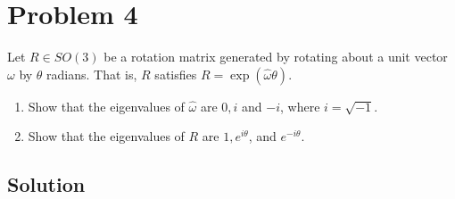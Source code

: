 \section*{Problem 4}

Let \(R \in S O(3)\) be a rotation matrix generated by rotating about a unit vector \(\omega \) by \(\theta \) radians.
That is, \(R\) satisfies \(R=\exp (\hat{\omega} \theta)\).
\begin{enumerate}[label= (\alph*)]
    \item Show that the eigenvalues of \(\hat{\omega}\) are \(0, i\) and \(-i\), where \(i=\sqrt{-1}\).
    \item Show that the eigenvalues of \(R\) are \(1, e^{i \theta}\), and \(e^{-i \theta}\).
\end{enumerate}

\subsection*{Solution}
